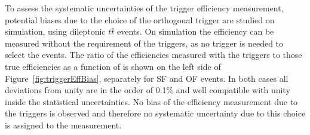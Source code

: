 
To assess the systematic uncertainties of the trigger efficiency measurement, potential biases due to the choice of the orthogonal trigger  are studied on simulation, using dileptonic $t\bar{t}$ events. On simulation the efficiency can be measured without the requirement of the \HT triggers, as no trigger is needed to select the events. The ratio of the efficiencies measured with the \HT triggers to those true efficiencies as a function of \mll is shown on the left side of Figure~\ref{fig:triggerEffBias}, separately for SF and OF events. In both cases all deviations from unity are in the order of 0.1\% and well compatible with unity inside the statistical uncertainties. No bias of the efficiency measurement due to the \HT triggers is observed and therefore no systematic uncertainty due to this choice is assigned to the measurement.
